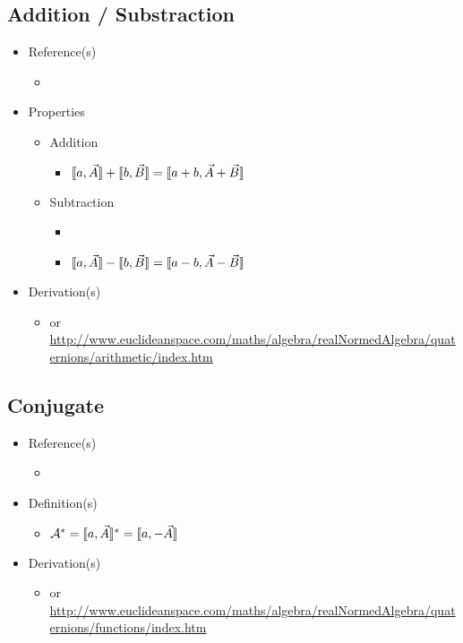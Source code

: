 \documentclass[letterpaper]{article}
\begin{document}
	\subsection{Addition / Substraction}
	\begin{itemize}
		\item Reference(s)
			\begin{itemize}
				\item \cite{Altmann1986}
			\end{itemize}
		\item Properties
			\begin{itemize}
				\item Addition
					\begin{itemize}
						\item $\llbracket a, \vec{A} \rrbracket + \llbracket b, \vec{B} \rrbracket = \llbracket a + b, \vec{A} + \vec{B} \rrbracket$
					\end{itemize}
				\item Subtraction
					\begin{itemize}
						\item \item $\llbracket a, \vec{A} \rrbracket - \llbracket b, \vec{B} \rrbracket = \llbracket a - b, \vec{A} - \vec{B} \rrbracket$
					\end{itemize}
			\end{itemize}
		\item Derivation(s)
			\begin{itemize}
				\item \cite{Altmann1986} or \url{http://www.euclideanspace.com/maths/algebra/realNormedAlgebra/quaternions/arithmetic/index.htm}
			\end{itemize}
	\end{itemize}
	
	\subsection{Conjugate}
	\begin{itemize}
		\item Reference(s)
			\begin{itemize}
				\item \cite{Altmann1986}
			\end{itemize}
		\item Definition(s)
			\begin{itemize}
				\item $\mathcal{A}^\ast = \llbracket a, \vec{A} \rrbracket^\ast = \llbracket a, -\vec{A} \rrbracket$
			\end{itemize}
		\item Derivation(s)
			\begin{itemize}
				\item \cite{Altmann1986} or \url{http://www.euclideanspace.com/maths/algebra/realNormedAlgebra/quaternions/functions/index.htm}
			\end{itemize}
	\end{itemize}
	
\end{document}
